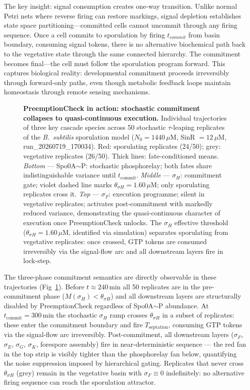 \documentclass[10pt,letterpaper]{article}
\begin{document}
The key insight: signal consumption creates one-way transition. Unlike normal Petri nets where reverse firing can restore markings, signal depletion establishes state space partitioning---committed cells cannot uncommit through any firing sequence. Once a cell commits to sporulation by firing $t_{commit}$ from basin boundary, consuming signal tokens, there is no alternative biochemical path back to the vegetative state through the same connected hierarchy. The commitment becomes final---the cell must follow the sporulation program forward. This captures biological reality: developmental commitment proceeds irreversibly through forward-only paths, even though metabolic feedback loops maintain homeostasis through remote sensing mechanisms.

\begin{figure}[!h]
    \caption{%
        \textbf{PreemptionCheck in action: stochastic commitment collapses to quasi-continuous execution.}
        Individual trajectories of three key cascade species across 50 stochastic $\tau$-leaping replicates
        of the \textit{B.~subtilis} sporulation model
        ($N_0 = 1440\,\mu$M, SinR $= 12\,\mu$M, run\_20260719\_170034).
        Red: sporulating replicates (24/50); grey: vegetative replicates (26/50). Thick lines: fate-conditioned means.
        \textit{Bottom} — Spo0A$\sim$P: stochastic phosphorelay; both fates share indistinguishable variance until $t_\mathrm{commit}$.
        \textit{Middle} — $\sigma_H$: commitment gate; violet dashed line marks $\theta_{\sigma H} = 1.60\,\mu$M; only sporulating replicates cross it.
        \textit{Top} — $\sigma_F$: execution programme; silent in vegetative replicates; activates post-commitment with markedly reduced variance, demonstrating the quasi-continuous character of execution once PreemptionCheck unlocks.
        The $\sigma_H$ effective threshold ($\theta_{\sigma H} = 1.60\,\mu$M, identified via simulation) separates sporulating from vegetative replicates: once crossed, GTP tokens are consumed irreversibly via the signal-flow arc and all downstream layers fire in lock-step.%
    }
    \label{fig:preemption_cascade}
\end{figure}

The three-phase commitment semantics are directly observable in these trajectories (Fig~\ref{fig:preemption_cascade}).
Before $t \approx 240\,\mathrm{min}$ all 50 replicates are in the pre-commitment phase ($M(\sigma_H) < \theta_{\sigma H}$) and all downstream layers are structurally disabled by PreemptionCheck regardless of Spo0A$\sim$P abundance.
At $t_\mathrm{commit} = 300\,\mathrm{min}$ the stochastic $\sigma_H$ ramp crosses $\theta_{\sigma H}$ in a subset of replicates: these enter the commitment boundary and fire $T_{\mathrm{septation}}$, consuming GTP tokens via the signal-flow arc irreversibly.
Post-commitment, all downstream layers ($\sigma_F$, $\sigma_E$, $\sigma_G$, $\sigma_K$, forespore assembly) fire in near-deterministic sequence — the red fan in the top strip is visibly tighter than the phosphorelay fan below, quantifying the noise suppression imposed by hierarchical gating.
Replicates that never cross $\theta_{\sigma H}$ (grey) remain in the vegetative basin with $\sigma_F \equiv 0$ indefinitely: no alternative firing sequence can reach the sporulation attractor.
\end{document}
